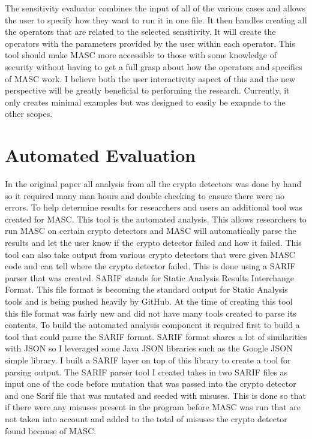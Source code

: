The sensitivity evaluator combines the input of all of the various cases and allows the user to specify how they want to run it in one file. It then handles creating all the operators that are related to the selected sensitivity. It will create the operators with the parameters provided by the user within each operator. This tool should make MASC more accessible to those with some knowledge of security without having to get a full grasp about how the operators and specifics of MASC work. I believe both the user interactivity aspect of this and the new perspective will be greatly beneficial to performing the research. Currently, it only creates minimal examples but was designed to easily be exapnde to the other scopes.


\section{Automated Evaluation}
\label{ch3:subsec:automation}

In the original paper all analysis from all the crypto detectors was done by hand so it required many man hours and double checking to ensure there were no errors. To help determine results for researchers and users an additional tool was created for MASC. This tool is the automated analysis. This allows researchers to run MASC on certain crypto detectors and MASC will automatically parse the results and let the user know if the crypto detector failed and how it failed. This tool can also take output from various crypto detectors that were given MASC code and can tell where the crypto detector failed. This is done using a SARIF parser that was created. SARIF stands for Static Analysis Results Interchange Format. This file format is becoming the standard output for Static Analysis tools and is being pushed heavily by GitHub. At the time of creating this tool this file format was fairly new and did not have many tools created to parse its contents. To build the automated analysis component it required first to build a tool that could parse the SARIF format. SARIF format shares a lot of similarities with JSON so I leveraged some Java JSON libraries such as the Google JSON simple library. I built a SARIF layer on top of this library to create a tool for parsing output. The SARIF parser tool I created takes in two SARIF files as input one of the code before mutation that was passed into the crypto detector and one Sarif file that was mutated and seeded with misuses. This is done so that if there were any misuses present in the program before MASC was run that are not taken into account and added to the total of misuses the crypto detector found because of MASC. 

